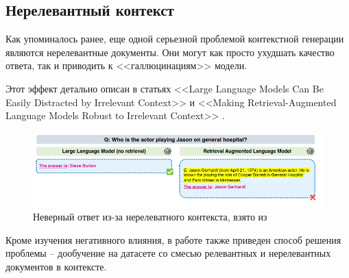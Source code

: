 \newpage

\subsection{Нерелевантный контекст}
\label{subsec:raft} 

Как упоминалось ранее, еще одной серьезной проблемой контекстной генерации являются нерелевантные документы. Они могут как просто ухудшать качество ответа, так и приводить к <<галлюцинациям>> модели.

Этот эффект детально описан в статьях <<Large Language Models Can Be Easily Distracted by Irrelevant Context>> \cite{irrelevant_retrieve} и <<Making Retrieval-Augmented Language Models Robust to Irrelevant Context>> \cite{irrelevant_retrieve_ralm}.

\begin{figure}[h!]
    \centering
    \includegraphics[scale=0.5]{images/hallucinations.png}
    \caption{Неверный ответ из-за нерелеватного контекста, взято из \cite{irrelevant_retrieve_ralm}}
\end{figure}

Кроме изучения негативного влияния, в работе \cite{irrelevant_retrieve_ralm} также приведен способ решения проблемы -- дообучение на датасете со смесью релевантных и нерелевантных документов в контексте. 

\hfill

